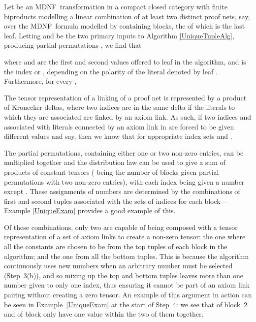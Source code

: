 \documentclass{LMCS}
\theoremstyle{plain}\newtheorem*{cLm}{Claim}
\newcommand{\p}{} \newcommand{\N}{\mathbb{N}}
\begin{document}
  \begin{lem} \label{UniqueAlgSepsAndAnnisClaim}
  Let  be an MDNF~transformation in a compact closed category  with finite biproducts modelling a linear combination of at least two distinct proof nets,  say, over the MDNF~formula modelled by  containing  blocks, the  of which is the last leaf. Letting  and  be the two primary inputs to Algorithm \ref{UniqueTupleAlg}, producing  partial permutations , we find that
  
  where  and  are the first and second values offered to leaf  in the algorithm, and  is the index  or , depending on the polarity of the literal denoted by leaf . Furthermore, for every ,
  
  \end{lem}
  \proof
  The tensor representation of a linking of a proof net is represented by a product of Kronecker deltas, where two indices are in the same delta if the literals to which they are associated are linked by an axiom link. As such, if two indices  and  associated with literals connected by an axiom link in  are forced to be given different values  and  say, then we know that  for appropriate index sets  and .
  
  \p The partial permutations, containing either one or two non-zero entries, can be multiplied together and the distribution law can be used to give a sum of  products of constant tensors ( being the number of blocks given partial permutations with two non-zero entries), with each index being given a number except . These  assignments of numbers are determined by the combinations of first and second tuples associated with the sets of indices for each block---Example \ref{UniqueExam} provides a good example of this.
  
  \p Of these combinations, only two are capable of being composed with a tensor representation of a set of axiom links to create a non-zero tensor: the one where all the constants are chosen to be from the top tuples of each block in the algorithm; and the one from all the bottom tuples. This is because the algorithm continuously uses new numbers when an arbitrary number must be selected (Step~3(b)), and so mixing up the top and bottom tuples leaves more than one number given to only one index, thus ensuring it cannot be part of an axiom link pairing without creating a zero tensor. An example of this argument in action can be seen in Example~\ref{UniqueExam} at the start of Step~4: we see that  of block~2 and  of block  only have one value  within the two of them together.
  
\end{document}
